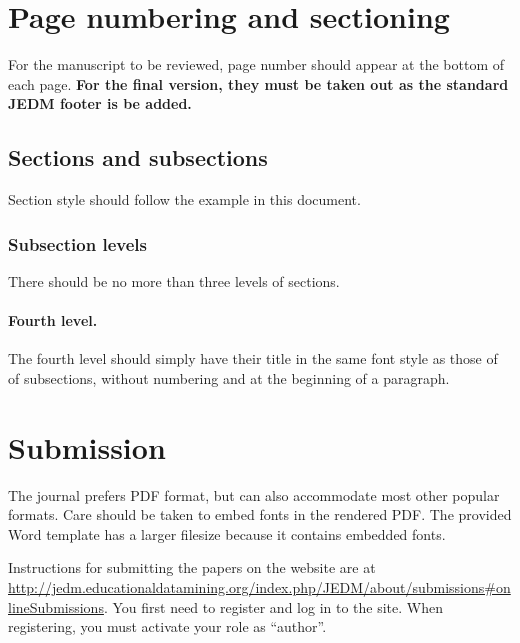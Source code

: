 \documentclass[notitlepage,12pt]{jedm}
\begin{document}
\section{Page numbering and sectioning}

For the manuscript to be reviewed, page number should appear at the bottom of each page.  \textbf{For the final version, they must be taken out as the standard JEDM footer is be added.}

\subsection{Sections and subsections}

Section style should follow the example in this document.

\subsubsection{Subsection levels}

There should be no more than three levels of sections.

\paragraph{Fourth level.}

The fourth level should simply have their title in the same font style as those of of subsections, without numbering and at the beginning of a paragraph.

\section{Submission}

The journal prefers PDF format, but can also accommodate most other popular formats.  Care should be taken to embed fonts in the rendered PDF. The provided Word template has a larger filesize because it contains embedded fonts.

Instructions for submitting the papers on the website are at \\
\url{http://jedm.educationaldatamining.org/index.php/JEDM/about/submissions#onlineSubmissions}.  You first need to register and log in to the site.  When registering, you must activate your role as ``author''.




\end{document}
